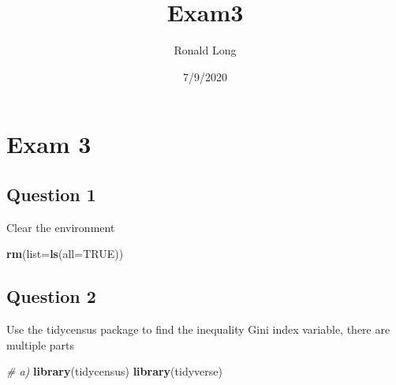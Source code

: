 \documentclass[
]{article}
\title{Exam3}
\author{Ronald Long}
\date{7/9/2020}
\newenvironment{Shaded}{\begin{snugshade}}{\end{snugshade}}
\newcommand{\CommentTok}[1]{\textcolor[rgb]{0.56,0.35,0.01}{\textit{#1}}}
\newcommand{\DataTypeTok}[1]{\textcolor[rgb]{0.13,0.29,0.53}{#1}}
\newcommand{\KeywordTok}[1]{\textcolor[rgb]{0.13,0.29,0.53}{\textbf{#1}}}
\newcommand{\NormalTok}[1]{#1}
\newcommand{\OperatorTok}[1]{\textcolor[rgb]{0.81,0.36,0.00}{\textbf{#1}}}
\newcommand{\OtherTok}[1]{\textcolor[rgb]{0.56,0.35,0.01}{#1}}
\begin{document}
\maketitle

\begin{Shaded}
\end{Shaded}

\hypertarget{exam-3}{%
\section{Exam 3}\label{exam-3}}

\hypertarget{question-1}{%
\subsection{Question 1}\label{question-1}}

Clear the environment

\begin{Shaded}
\begin{Highlighting}[]
\KeywordTok{rm}\NormalTok{(}\DataTypeTok{list=}\KeywordTok{ls}\NormalTok{(}\DataTypeTok{all=}\OtherTok{TRUE}\NormalTok{))}
\end{Highlighting}
\end{Shaded}

\hypertarget{question-2}{%
\subsection{Question 2}\label{question-2}}

Use the tidycensus package to find the inequality Gini index variable,
there are multiple parts

\begin{Shaded}
\begin{Highlighting}[]
\CommentTok{# a)}
\KeywordTok{library}\NormalTok{(tidycensus)}
\KeywordTok{library}\NormalTok{(tidyverse)}
\end{Highlighting}
\end{Shaded}
\end{document}
